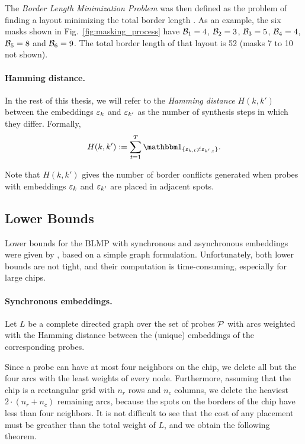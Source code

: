 The \emph{Border Length Minimization Problem} was then defined as the problem of
finding a layout minimizing the total border length \citep{Hannenhalli2002}. As
an example, the six masks shown in Fig.~\ref{fig:masking_process} have
${\mathcal{B}}_1 = 4$, ${\mathcal{B}}_2 = 3$, ${\mathcal{B}}_3 = 5$, ${\mathcal{B}}_4 = 4$, ${\mathcal{B}}_5 = 8$ and
${\mathcal{B}}_6 = 9$. The total border length of that layout is 52 (masks 7 to 10 not
shown).

\paragraph{Hamming distance.}
In the rest of this thesis, we will refer to the \emph{Hamming distance}
$H(k,k')$ between the embeddings $\varepsilon_k$ and $\varepsilon_{k'}$ as the number of
synthesis steps in which they differ. Formally,
\begin{equation}
\label{eq:hamming}
  H(k,k') := \sum_{t=1}^{T} \Ind{\eps_{k,t} \neq \eps_{k',t}}.
\end{equation}

Note that $H(k,k')$ gives the number of border conflicts generated when probes
with embeddings $\varepsilon_k$ and $\varepsilon_{k'}$ are placed in adjacent spots.

\subsection{Lower Bounds}

Lower bounds for the BLMP with synchronous and asynchronous embeddings were
given by \citet{Kahng2002}, based on a simple graph formulation. Unfortunately,
both lower bounds are not tight, and their computation is time-consuming,
especially for large chips.

\paragraph{Synchronous embeddings.}
Let $L$ be a complete directed graph over the set of probes ${\mathcal{P}}$ with arcs
weighted with the Hamming distance between the (unique) embeddings of the
corresponding probes.

Since a probe can have at most four neighbors on the chip, we delete all but the
four arcs with the least weights of every node. Furthermore, assuming that the
chip is a rectangular grid with $n_r$ rows and $n_c$ columns, we delete the
heaviest $2 \cdot (n_r + n_c)$ remaining arcs, because the spots on the borders
of the chip have less than four neighbors. It is not difficult to see that the
cost of any placement must be greather than the total weight of $L$, and we
obtain the following theorem.

